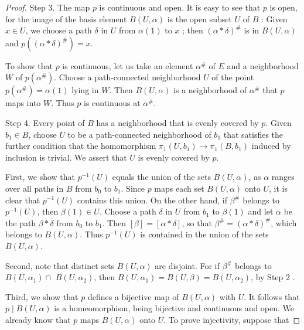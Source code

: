 \begin{proof}
Step 3. The map \(p\) is continuous and open. It is easy to see that \(p\) is open, for the image of the basis element \(B( {U,\alpha })\) is the open subset \(U\) of \(B\) : Given \(x \in U\), we choose a path \(\delta\) in \(U\) from \(\alpha (1)\) to \(x\) ; then \({( \alpha * \delta ) }^{\# }\) is in \(B( {U,\alpha })\) and \(p( {( \alpha * \delta ) }^{\# }) = x\).

To show that \(p\) is continuous, let us take an element \({\alpha }^{\# }\) of \(E\) and a neighborhood \(W\) of \(p( {\alpha }^{\# })\). Choose a path-connected neighborhood \(U\) of the point \(p( {\alpha }^{\# }) = \alpha (1)\) lying in \(W\). Then \(B( {U,\alpha })\) is a neighborhood of \({\alpha }^{\# }\) that \(p\) maps into \(W\). Thus \(p\) is continuous at \({\alpha }^{\# }\).

Step 4. Every point of \(B\) has a neighborhood that is evenly covered by \(p\). Given \(b_{1} \in B\), choose \(U\) to be a path-connected neighborhood of \(b_{1}\) that satisfies the further condition that the homomorphism \({\pi }_{1}( {U,b_{1}}) \rightarrow {\pi }_{1}( {B,b_{1}})\) induced by inclusion is trivial. We assert that \(U\) is evenly covered by \(p\).

First, we show that \(p^{-1}( U)\) equals the union of the sets \(B( {U,\alpha })\), as \(\alpha\) ranges over all paths in \(B\) from \(b_{0}\) to \(b_{1}\). Since \(p\) maps each set \(B( {U,\alpha })\) onto \(U\), it is clear that \(p^{-1}( U)\) contains this union. On the other hand, if \({\beta }^{\# }\) belongs to \(p^{-1}( U)\), then \(\beta (1) \in U\). Choose a path \(\delta\) in \(U\) from \(b_{1}\) to \(\beta (1)\) and let \(\alpha\) be the path \(\beta * \bar{\delta }\) from \(b_{0}\) to \(b_{1}\). Then \([ \beta ] = [ {\alpha * \delta }]\), so that \({\beta }^{\# } = {( \alpha * \delta ) }^{\# }\), which belongs to \(B( {U,\alpha })\). Thus \(p^{-1}( U)\) is contained in the union of the sets \(B( {U,\alpha })\).

Second, note that distinct sets \(B( {U,\alpha })\) are disjoint. For if \({\beta }^{\# }\) belongs to \(B( {U,{\alpha }_{1}}) \cap\) \(B( {U,{\alpha }_{2}})\), then \(B( {U,{\alpha }_{1}}) = B( {U,\beta }) = B( {U,{\alpha }_{2}})\), by Step 2 .

Third, we show that \(p\) defines a bijective map of \(B( {U,\alpha })\) with \(U\). It follows that \(p \mid B( {U,\alpha })\) is a homeomorphism, being bijective and continuous and open. We already know that \(p\) maps \(B( {U,\alpha })\) onto \(U\). To prove injectivity, suppose that


\end{proof}
